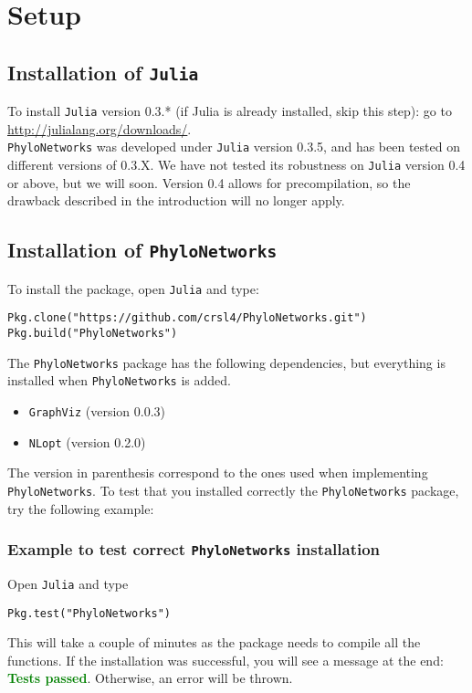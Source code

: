 \documentclass[12pt]{article}
\begin{document}
\section{Setup}
\subsection{Installation of \texttt{Julia}}
To install \texttt{Julia} version 0.3.* (if Julia is already installed, skip
this step): go to\\ \url{http://julialang.org/downloads/}.\\
\texttt{PhyloNetworks} was developed under \texttt{Julia}
version 0.3.5, and has been tested on different versions of 0.3.X.
We have not tested its robustness on \texttt{Julia} version 0.4 or
above, but we will soon. Version 0.4 allows for precompilation, so the
drawback described in the introduction will no longer apply.

\subsection{Installation of \texttt{PhyloNetworks}}
To install the package,
open
\texttt{Julia} and type:
\begin{lstlisting}
Pkg.clone("https://github.com/crsl4/PhyloNetworks.git")
Pkg.build("PhyloNetworks")
\end{lstlisting}

The \texttt{PhyloNetworks} package has the following dependencies, but everything is installed when
\texttt{PhyloNetworks} is added.
\begin{itemize}
\item \texttt{GraphViz} (version 0.0.3)
\item \texttt{NLopt} (version 0.2.0)
\end{itemize}
The version in parenthesis correspond to the ones used when
implementing \texttt{PhyloNetworks}.
To test that you installed correctly the \texttt{PhyloNetworks} package, try the following example:

\subsubsection{Example to test correct \texttt{PhyloNetworks} installation}
Open \texttt{Julia} and type
\begin{lstlisting}
Pkg.test("PhyloNetworks")
\end{lstlisting}
This will take a couple of
minutes as the package needs to compile all the functions. If the
installation was successful, you will see a message at the end:
\textcolor{green}{\textbf{Tests passed}}. Otherwise, an error will be thrown.
\end{document}
